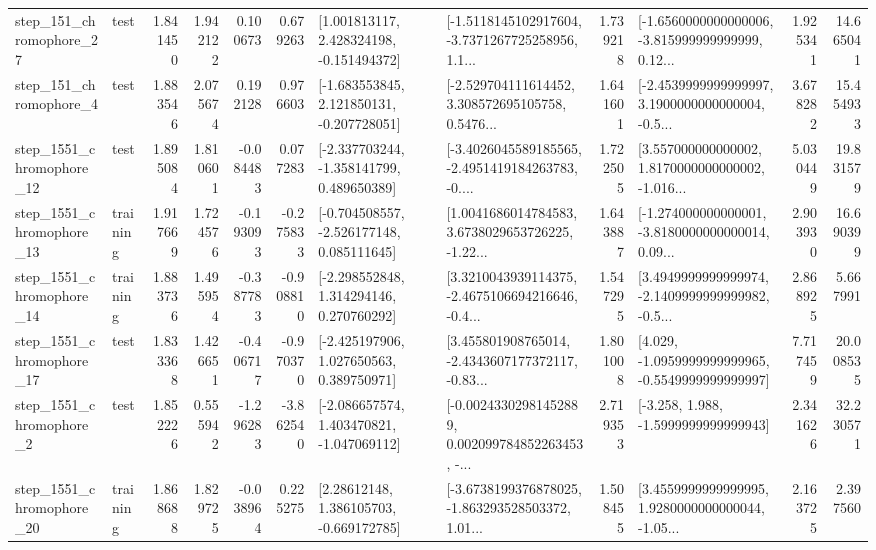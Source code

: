 \begin{tabular}{llrrrrllrlrr}
  step\_151\_chromophore\_27 &      test &      1.841450 &    1.942122 &      0.100673 &  0.679263 &    [1.001813117, 2.428324198, -0.151494372] &  [-1.5118145102917604, -3.7371267725258956, 1.1... &       1.739218 &  [-1.6560000000000006, -3.815999999999999, 0.12... &            1.925341 &         14.665041 \\
   step\_151\_chromophore\_4 &      test &      1.883546 &    2.075674 &      0.192128 &  0.976603 &   [-1.683553845, 2.121850131, -0.207728051] &  [-2.529704111614452, 3.308572695105758, 0.5476... &       1.641601 &  [-2.4539999999999997, 3.1900000000000004, -0.5... &            3.678282 &         15.454933 \\
 step\_1551\_chromophore\_12 &      test &      1.895084 &    1.810601 &     -0.084483 &  0.077283 &   [-2.337703244, -1.358141799, 0.489650389] &  [-3.4026045589185565, -2.4951419184263783, -0.... &       1.722505 &  [3.557000000000002, 1.8170000000000002, -1.016... &            5.030449 &         19.831579 \\
 step\_1551\_chromophore\_13 &  training &      1.917669 &    1.724576 &     -0.193093 & -0.275833 &   [-0.704508557, -2.526177148, 0.085111645] &  [1.0041686014784583, 3.6738029653726225, -1.22... &       1.643887 &  [-1.274000000000001, -3.8180000000000014, 0.09... &            2.903930 &         16.690399 \\
 step\_1551\_chromophore\_14 &  training &      1.883736 &    1.495954 &     -0.387783 & -0.908810 &    [-2.298552848, 1.314294146, 0.270760292] &  [3.3210043939114375, -2.4675106694216646, -0.4... &       1.547295 &  [3.4949999999999974, -2.1409999999999982, -0.5... &            2.868925 &          5.667991 \\
 step\_1551\_chromophore\_17 &      test &      1.833368 &    1.426651 &     -0.406717 & -0.970370 &    [-2.425197906, 1.027650563, 0.389750971] &  [3.455801908765014, -2.4343607177372117, -0.83... &       1.801008 &  [4.029, -1.0959999999999965, -0.5549999999999997] &            7.717459 &         20.008535 \\
  step\_1551\_chromophore\_2 &      test &      1.852226 &    0.555942 &     -1.296283 & -3.862540 &   [-2.086657574, 1.403470821, -1.047069112] &  [-0.00243302981452889, 0.002099784852263453, -... &       2.719353 &               [-3.258, 1.988, -1.5999999999999943] &            2.341626 &         32.230571 \\
 step\_1551\_chromophore\_20 &  training &      1.868688 &    1.829725 &     -0.038964 &  0.225275 &     [2.28612148, 1.386105703, -0.669172785] &  [-3.6738199376878025, -1.863293528503372, 1.01... &       1.508455 &  [3.4559999999999995, 1.9280000000000044, -1.05... &            2.163725 &          2.397560 \\

\end{tabular}
